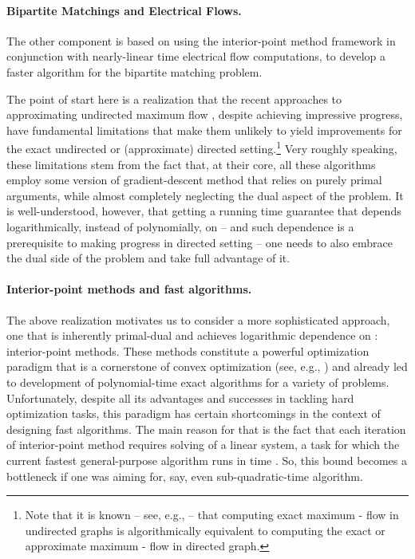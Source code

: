 \documentclass[11pt, letterpaper]{article}
\begin{document}
\paragraph{Bipartite Matchings and Electrical Flows.} The other component is based on using the interior-point method framework in conjunction with nearly-linear time electrical flow computations, to develop a faster algorithm for the bipartite matching problem. 

The point of start here is a realization that the recent approaches to approximating undirected maximum flow \cite{ChristianoKMST11,LeeRS13,Sherman13,KelnerLOS13}, despite achieving impressive progress, have fundamental limitations that make them unlikely to yield improvements for the exact undirected or (approximate) directed setting.\footnote{Note that it is known -- see, e.g., \cite{Madry11} -- that computing exact maximum - flow in undirected graphs is algorithmically equivalent to computing the exact or approximate maximum - flow in directed graph.}  Very roughly speaking, these limitations stem from the fact that, at their core, all these algorithms employ some version of gradient-descent method that relies on purely primal arguments, while almost completely neglecting the dual aspect of the problem. It is well-understood, however, that getting a running time guarantee that depends logarithmically, instead of polynomially, on  -- and such dependence is a prerequisite to making progress in directed setting -- one needs to also embrace  the dual side of the problem and take full advantage of it.  

\paragraph{Interior-point methods and fast algorithms.} The above realization motivates us to consider a more sophisticated approach, one that is inherently primal-dual and achieves logarithmic dependence on : interior-point methods. These methods constitute a powerful optimization paradigm that is a cornerstone of convex optimization (see, e.g., \cite{BoydV04,Wright97,Ye97}) and already led to development of polynomial-time exact algorithms for a variety of problems. Unfortunately, despite all its advantages and successes in tackling hard optimization tasks, this paradigm has certain shortcomings in the context of designing fast algorithms. The main reason for that is the fact that each iteration of interior-point method requires solving of a linear system, a task for which the current fastest general-purpose algorithm runs in  time \cite{AhoHU74,CoppersmithW90,Vassilevska12}. So, this bound becomes a bottleneck if one was aiming for, say, even sub-quadratic-time algorithm.   
\end{document}
